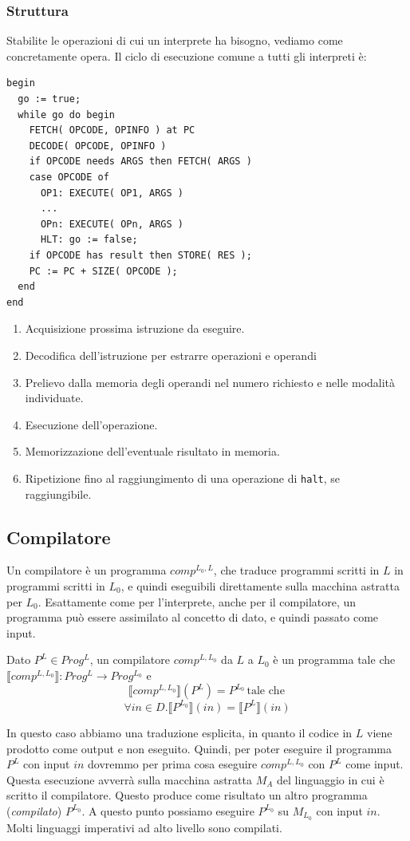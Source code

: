 \documentclass[oneside,a4paper,11pt]{book}
\theoremstyle{italicstyle}
\theoremstyle{normStyle}
\begin{document}
\subsubsection{Struttura}
Stabilite le operazioni di cui un interprete ha bisogno, vediamo come 
concretamente opera. Il ciclo di esecuzione comune a tutti gli interpreti è:
\begin{lstlisting}
begin
  go := true;
  while go do begin
    FETCH( OPCODE, OPINFO ) at PC 
    DECODE( OPCODE, OPINFO )
    if OPCODE needs ARGS then FETCH( ARGS )
    case OPCODE of 
      OP1: EXECUTE( OP1, ARGS )
      ... 
      OPn: EXECUTE( OPn, ARGS )
      HLT: go := false;
    if OPCODE has result then STORE( RES );
    PC := PC + SIZE( OPCODE );
  end
end
\end{lstlisting}
\begin{enumerate}
  \item Acquisizione prossima istruzione da eseguire.
  \item Decodifica dell'istruzione per estrarre operazioni e operandi
  \item Prelievo dalla memoria degli operandi nel numero richiesto e
  nelle modalità individuate.
  \item Esecuzione dell'operazione.
  \item Memorizzazione dell'eventuale risultato in memoria.
  \item Ripetizione fino al raggiungimento di una operazione di \verb|halt|,
  se raggiungibile.
\end{enumerate}
\subsection{Compilatore}
Un compilatore è un programma $comp^{L_0, L}$, che traduce programmi 
scritti in $L$ in programmi scritti in $L_0$, e quindi eseguibili 
direttamente sulla macchina astratta per $L_0$. Esattamente 
come per l'interprete, anche per il compilatore, un programma può essere assimilato 
al concetto di dato, e quindi passato come input.
\begin{tcolorbox}[title={Compilatore da $L$ a $L_0$}]
Dato $P^L \in Prog^L$, un compilatore $comp^{L,L_0}$ da $L$
a $L_0$ è un programma tale che $\llbracket comp^{L,L_0} \rrbracket:
Prog^L \rightarrow Prog^{L_0}$ e 
\[
\llbracket comp^{L,L_0}\rrbracket (P^L) = P^{L_0}\,\text{tale che}\,
\]
\[
\forall in \in D.\llbracket P^{L_0}\rrbracket (in) =
\llbracket P^{L}\rrbracket(in)
\]
\end{tcolorbox}
In questo caso abbiamo una traduzione esplicita, in quanto il 
codice in $L$ viene prodotto come output e non eseguito.
Quindi, per poter eseguire il programma $P^L$ con input $in$
dovremmo per prima cosa eseguire $comp^{L,L_0}$ con $P^L$
come input. Questa esecuzione avverrà sulla macchina astratta $M_A$
del linguaggio in cui è scritto il compilatore. Questo produce 
come risultato un altro programma (\textit{compilato}) $P^{L_0}$.
A questo punto possiamo eseguire $P^{L_0}$ su $M_{L_0}$ con 
input $in$. Molti linguaggi imperativi ad alto livello sono compilati.
\end{document}

